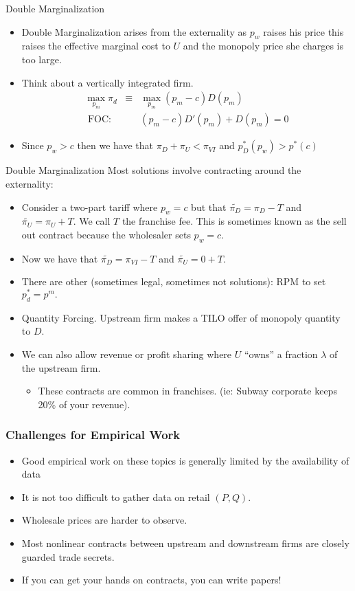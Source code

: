 \begin{frame}{Double Marginalization}
\begin{itemize}
\item Double Marginalization arises from the externality as $p_w$ raises his price this raises the effective marginal cost to $U$ and the monopoly price she charges is too large.
\item Think about a vertically integrated firm.
\begin{eqnarray*}
\max_{p_m} \pi_d &\equiv& \max_{p_m} (p_m-c) D(p_m) \\
\mbox{ FOC: }&&  (p_m - c) D'(p_m) + D(p_m) = 0
\end{eqnarray*}
\item Since $p_w > c$ then we have that $\pi_D + \pi_U < \pi_{VI}$ and $p_D^*(p_w) > p^*(c)$
\end{itemize}
\end{frame}


\begin{frame}{Double Marginalization}
Most solutions involve contracting around the externality:
\begin{itemize}
\item Consider a \alert{two-part tariff} where $p_w = c$ but that $\widetilde{\pi_D} =\pi_D -T$ and  $\widetilde{\pi_U} =\pi_U +T$. We call $T$ the \alert{franchise fee}. This is sometimes known as the \alert{sell out contract} because the wholesaler sets $p_w=c$. 
\item Now we have that $\widetilde{\pi_D} = \pi_{VI} - T$ and $\widetilde{\pi_U} = 0 + T$.
\item There are other (sometimes legal, sometimes not solutions): \alert{RPM} to set $p_d^* = p^m.$
\item \alert{Quantity Forcing}. Upstream firm makes a TILO offer of monopoly quantity to $D$.
\item We can also allow \alert{revenue or profit sharing } where $U$ ``owns'' a fraction $\lambda$ of the upstream firm.
\begin{itemize}
\item These contracts are common in franchises. (ie: Subway corporate keeps 20\% of your revenue).
\end{itemize}
\end{itemize}
\end{frame}


\begin{frame}
\small
\frametitle{Challenges for  Empirical Work}
\begin{itemize}
\item Good empirical work on these topics is generally limited by the availability of data
\item It is not too difficult to gather data on retail $(P,Q)$.
\item Wholesale prices are harder to observe.
\item Most nonlinear contracts between upstream and downstream firms are closely guarded trade secrets.
\item If you can get your hands on contracts, you can write papers!
\end{itemize}
\end{frame}

